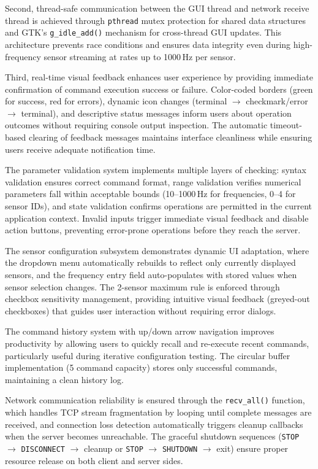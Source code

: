 Second, thread-safe communication between the GUI thread and network receive thread is achieved through \texttt{pthread} mutex protection for shared data structures and GTK's \texttt{g\_idle\_add()} mechanism for cross-thread GUI updates. This architecture prevents race conditions and ensures data integrity even during high-frequency sensor streaming at rates up to 1000\,Hz per sensor.

Third, real-time visual feedback enhances user experience by providing immediate confirmation of command execution success or failure. Color-coded borders (green for success, red for errors), dynamic icon changes (terminal $\rightarrow$ checkmark/error $\rightarrow$ terminal), and descriptive status messages inform users about operation outcomes without requiring console output inspection. The automatic timeout-based clearing of feedback messages maintains interface cleanliness while ensuring users receive adequate notification time.

The parameter validation system implements multiple layers of checking: syntax validation ensures correct command format, range validation verifies numerical parameters fall within acceptable bounds (10--1000\,Hz for frequencies, 0--4 for sensor IDs), and state validation confirms operations are permitted in the current application context. Invalid inputs trigger immediate visual feedback and disable action buttons, preventing error-prone operations before they reach the server.

The sensor configuration subsystem demonstrates dynamic UI adaptation, where the dropdown menu automatically rebuilds to reflect only currently displayed sensors, and the frequency entry field auto-populates with stored values when sensor selection changes. The 2-sensor maximum rule is enforced through checkbox sensitivity management, providing intuitive visual feedback (greyed-out checkboxes) that guides user interaction without requiring error dialogs.

The command history system with up/down arrow navigation improves productivity by allowing users to quickly recall and re-execute recent commands, particularly useful during iterative configuration testing. The circular buffer implementation (5 command capacity) stores only successful commands, maintaining a clean history log.

Network communication reliability is ensured through the \texttt{recv\_all()} function, which handles TCP stream fragmentation by looping until complete messages are received, and connection loss detection automatically triggers cleanup callbacks when the server becomes unreachable. The graceful shutdown sequences (\texttt{STOP} $\rightarrow$ \texttt{DISCONNECT} $\rightarrow$ cleanup or \texttt{STOP} $\rightarrow$ \texttt{SHUTDOWN} $\rightarrow$ exit) ensure proper resource release on both client and server sides.

